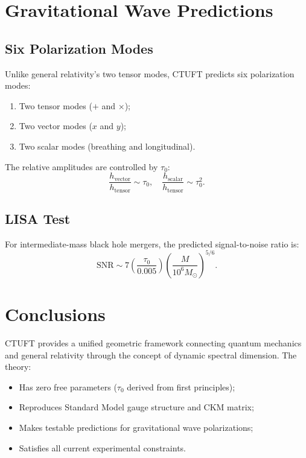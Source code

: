 \documentclass[aps,prd,reprint,superscriptaddress,amsmath,amssymb]{revtex4-2}
\begin{document}
\section{Gravitational Wave Predictions}
\label{sec:gw}

\subsection{Six Polarization Modes}

Unlike general relativity's two tensor modes, CTUFT predicts six polarization modes:
\begin{enumerate}
    \item Two tensor modes ($+$ and $\times$);
    \item Two vector modes ($x$ and $y$);
    \item Two scalar modes (breathing and longitudinal).
\end{enumerate}

The relative amplitudes are controlled by $\tau_0$:
\begin{equation}
    \frac{h_{\text{vector}}}{h_{\text{tensor}}} \sim \tau_0, \quad
    \frac{h_{\text{scalar}}}{h_{\text{tensor}}} \sim \tau_0^2.
\end{equation}

\subsection{LISA Test}

For intermediate-mass black hole mergers, the predicted signal-to-noise ratio is:
\begin{equation}
    \text{SNR} \sim 7 \left(\frac{\tau_0}{0.005}\right) \left(\frac{M}{10^6 M_\odot}\right)^{5/6}.
\end{equation}

\section{Conclusions}
\label{sec:conclusions}

CTUFT provides a unified geometric framework connecting quantum mechanics and general relativity through the concept of dynamic spectral dimension. The theory:
\begin{itemize}
    \item Has zero free parameters ($\tau_0$ derived from first principles);
    \item Reproduces Standard Model gauge structure and CKM matrix;
    \item Makes testable predictions for gravitational wave polarizations;
    \item Satisfies all current experimental constraints.
\end{itemize}
\end{document}

